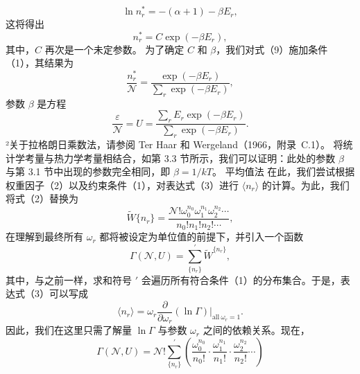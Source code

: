 \begin{equation}\tag{3.2.9}\label{eq:3.2.9}
\ln n _ { r } ^{*} = - ( \alpha + 1 ) - \beta E _ { r } ,
\end{equation}
这将得出
\begin{equation}\tag{3.2.10}\label{eq:3.2.10}
n _ { r } ^{*} = C \exp ( - \beta E _ { r } ) ,
\end{equation}
其中，\(C\) 再次是一个未定参数。
为了确定 \(C\) 和 \(\beta\)，我们对式（9）施加条件（1），其结果为
\begin{equation}\tag{3.2.11}\label{eq:3.2.11}
\frac { n _ { r } ^{*} } { \mathcal { N } } = \frac { \exp ( - \beta E _ { r } ) } { \sum _ { r } \exp ( - \beta E _ { r } ) } ,
\end{equation}
参数 \(\beta\) 是方程
\begin{equation}\tag{3.2.12}\label{eq:3.2.12}
\frac { \varepsilon } { \mathcal { N } } = U = \frac { \sum _ { r } E _ { r } \exp ( - \beta E _ { r } ) } { \sum _ { r } \exp ( - \beta E _ { r } ) } .
\end{equation}
²关于拉格朗日乘数法，请参阅 Ter Haar 和 Wergeland（1966，附录~C.1）。
将统计学考量与热力学考量相结合，如第 3.3 节所示，我们可以证明：此处的参数 \(\beta\) 与第 3.1 节中出现的参数完全相同，即 \(\beta = 1/kT\)。
平均值法
在此，我们尝试根据权重因子（2）以及约束条件（1），对表达式（3）进行 \(\langle n_{r}\rangle\) 的计算。为此，我们将式（2）替换为
\begin{equation}\tag{3.2.13}\label{eq:3.2.13}
\tilde { W } \{ n _ { r } \} = \frac { \mathcal { N } ! \omega _ { 0 } ^{n _ { 0} } \omega _ { 1 } ^{n _ { 1} } \omega _ { 2 } ^{n _ { 2} } \cdots } { n _ { 0 } ! n _ { 1 } ! n _ { 2 } ! \cdots } ,
\end{equation}
在理解到最终所有 \(\omega_{r}\) 都将被设定为单位值的前提下，并引入一个函数
\begin{equation}\tag{3.2.14}\label{eq:3.2.14}
\Gamma ( \mathcal { N } , U ) = \sum _ { \{ n _ { r } \} } ^{\prime} \tilde { W } ^{\{ n _ { r} \} } ,
\end{equation}
其中，与之前一样，求和符号 \(\prime\) 会遍历所有符合条件（1）的分布集合。于是，表达式（3）可以写成
\begin{equation}\tag{3.2.15}\label{eq:3.2.15}
\langle n _ { r } \rangle = \omega _ { r } \frac { \partial } { \partial \omega _ { r } } ( \ln \Gamma ) \bigg | _ { \mathrm { a l l } \ \omega _ { r } = 1 } .
\end{equation}
因此，我们在这里只需了解量 \(\ln\Gamma\) 与参数 \(\omega_{r}\) 之间的依赖关系。现在，
\begin{equation}\tag{3.2.16}\label{eq:3.2.16}
\Gamma ( \mathcal { N } , U ) = \mathcal { N } ! \sum _ { \{ n _ { r } \} } ^{\prime} \left( \frac { \omega _ { 0 } ^{n _ { 0} } } { n _ { 0 } ! } \cdot \frac { \omega _ { 1 } ^{n _ { 1} } } { n _ { 1 } ! } \cdot \frac { \omega _ { 2 } ^{n _ { 2} } } { n _ { 2 } ! } \cdots \right)
\end{equation}
